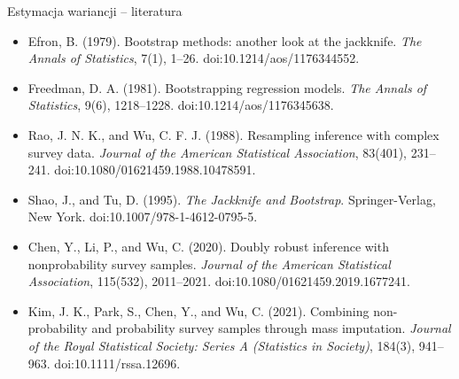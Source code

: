 \documentclass[10pt,ignorenonframetext, aspectratio=169]{beamer}
\begin{document}
\begin{frame}{Estymacja wariancji -- literatura}
\begin{itemize}
\scriptsize
    \item Efron, B. (1979). Bootstrap methods: another look at the jackknife. \textit{The Annals of Statistics}, 7(1), 1--26. doi:10.1214/aos/1176344552.
    \item Freedman, D. A. (1981). Bootstrapping regression models. \textit{The Annals of Statistics}, 9(6), 1218--1228. doi:10.1214/aos/1176345638.
    \item Rao, J. N. K., and Wu, C. F. J. (1988). Resampling inference with complex survey data. \textit{Journal of the American Statistical Association}, 83(401), 231--241. doi:10.1080/01621459.1988.10478591.
    \item Shao, J., and Tu, D. (1995). \textit{The Jackknife and Bootstrap}. Springer-Verlag, New York. doi:10.1007/978-1-4612-0795-5.
    \item Chen, Y., Li, P., and Wu, C. (2020). Doubly robust inference with nonprobability survey samples. \textit{Journal of the American Statistical Association}, 115(532), 2011--2021. doi:10.1080/01621459.2019.1677241.
    \item Kim, J. K., Park, S., Chen, Y., and Wu, C. (2021). Combining non-probability and probability survey samples through mass imputation. \textit{Journal of the Royal Statistical Society: Series A (Statistics in Society)}, 184(3), 941--963. doi:10.1111/rssa.12696.
\end{itemize}
\end{frame}
\end{document}
